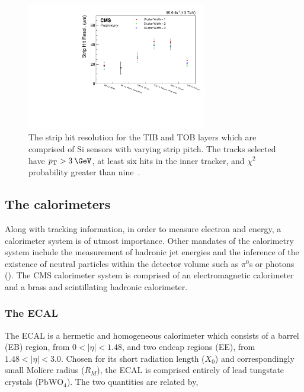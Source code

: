\begin{figure}
  \centering
  \includegraphics[width=0.7\textwidth]{figs/StripHitRes.pdf}
  \caption{The strip hit resolution for the TIB and TOB layers which are comprised of Si sensors with varying strip pitch. The tracks selected have $\pt>3\:\GeV$, at least six hits in the inner tracker, and $\chi^2$ probability greater than nine~\cite{TRKDPG}.}
  \label{fig:striphitres}
\end{figure} 

\subsection{The calorimeters}
\label{subsec:calos}

Along with tracking information, in order to measure electron \pt and energy, a calorimeter system is of utmost importance. Other mandates of the calorimetry system include the measurement of hadronic jet energies and the inference of the existence of neutral particles within the detector volume such as $\pi^{0}$s or photons (\gamma). The CMS calorimeter system is comprised of an electromagnetic calorimeter and a brass and scintillating hadronic calorimeter. 

\subsubsection{The ECAL}
\label{subsubsec:ECAL}

The ECAL is a hermetic and homogeneous calorimeter which consists of a barrel (EB) region, from $0 < |\eta| < 1.48$, and two endcap regions (EE), from $1.48 < |\eta| < 3.0$. Chosen for its short radiation length ($X_0$) and correspondingly small $\textrm{Moli}\grave{\textrm{e}}\textrm{re}$ radius ($R_{M}$), the ECAL is comprised entirely of lead tungstate crystals ($\textrm{PbWO}_4$). The two quantities are related by, 


